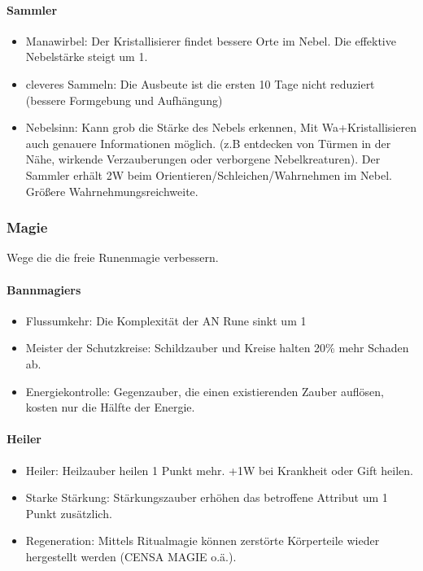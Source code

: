 \documentclass{article}
\begin{document}
\paragraph{Sammler}

\begin{itemize}
\item Manawirbel: Der Kristallisierer findet bessere Orte im Nebel. Die effektive Nebelstärke steigt um 1.
\item cleveres Sammeln: Die Ausbeute ist die ersten 10 Tage nicht reduziert (bessere Formgebung und Aufhängung)
\item Nebelsinn: Kann grob die Stärke des Nebels erkennen, Mit Wa+Kristallisieren auch genauere Informationen möglich. (z.B entdecken von Türmen in der Nähe, wirkende Verzauberungen oder verborgene Nebelkreaturen). Der Sammler erhält 2W beim Orientieren/Schleichen/Wahrnehmen im Nebel. Größere Wahrnehmungsreichweite.
\end{itemize}

\subsubsection{Magie}

Wege die die freie Runenmagie verbessern.

\paragraph{Bannmagiers}

\begin{itemize}
\item Flussumkehr: Die Komplexität der AN Rune sinkt um 1
\item Meister der Schutzkreise: Schildzauber und Kreise halten 20\% mehr Schaden ab.
\item Energiekontrolle: Gegenzauber, die einen existierenden Zauber auflösen, kosten nur die Hälfte der Energie.
\end{itemize}

\paragraph{Heiler}

\begin{itemize}
\item Heiler: Heilzauber heilen 1 Punkt mehr. +1W bei Krankheit oder Gift heilen.
\item Starke Stärkung: Stärkungszauber erhöhen das betroffene Attribut um 1 Punkt zusätzlich.
\item Regeneration: Mittels Ritualmagie können zerstörte Körperteile wieder hergestellt werden (CENSA MAGIE o.ä.).
\end{itemize}
\end{document}
